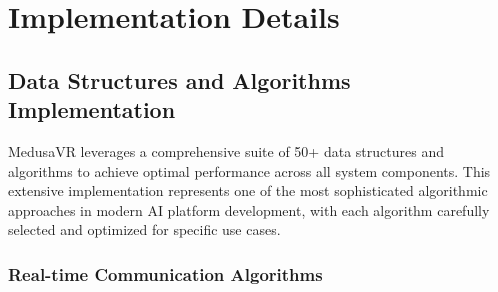 \documentclass[conference]{IEEEtran}
\begin{document}
\section{Implementation Details}

\subsection{Data Structures and Algorithms Implementation}
MedusaVR leverages a comprehensive suite of 50+ data structures and algorithms to achieve optimal performance across all system components. This extensive implementation represents one of the most sophisticated algorithmic approaches in modern AI platform development, with each algorithm carefully selected and optimized for specific use cases.

\subsubsection{Real-time Communication Algorithms}
\end{document}
